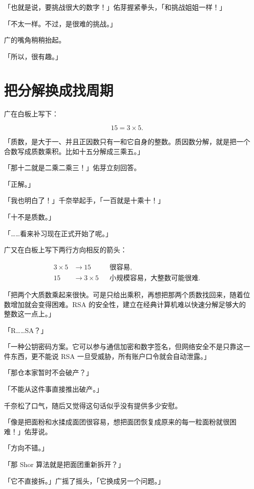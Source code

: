 「也就是说，要挑战很大的数字！」佑芽握紧拳头，「和挑战姐姐一样！」

「不太一样。不过，是很难的挑战。」

广的嘴角稍稍抬起。

「所以，很有趣。」

\section{把分解换成找周期}

广在白板上写下：

\begin{equation}
15 = 3 \times 5.
\end{equation}

「质数，是大于一、并且正因数只有一和它自身的整数。质因数分解，就是把一个合数写成质数乘积。比如十五分解成三乘五。」

「那十二就是二乘二乘三！」佑芽立刻回答。

「正解。」

「我也明白了！」千奈举起手，「一百就是十乘十！」

「十不是质数。」

「……看来补习现在正式开始了呢。」

广又在白板上写下两行方向相反的箭头：

\begin{align*}
3 \times 5 &\longrightarrow 15 && \text{很容易},\\
15 &\longrightarrow 3 \times 5 && \text{小规模容易，大整数可能很难}.
\end{align*}

「把两个大质数乘起来很快。可是只给出乘积，再想把那两个质数找回来，随着位数增加就会变得困难。RSA 的安全性，建立在经典计算机难以快速分解足够大的整数这一点上。」\cite{ch07shor}

「R……SA？」

「一种公钥密码方案。它可以参与通信加密和数字签名，但网络安全不是只靠这一件东西，更不能说 RSA 一旦受威胁，所有账户口令就会自动泄露。」

「那仓本家暂时不会破产？」

「不能从这件事直接推出破产。」

千奈松了口气，随后又觉得这句话似乎没有提供多少安慰。

「像是把面粉和水揉成面团很容易，想把面团恢复成原来的每一粒面粉就很困难！」佑芽说。

「方向不错。」

「那 Shor 算法就是把面团重新拆开？」

「它不直接拆。」广摇了摇头，「它换成另一个问题。」

